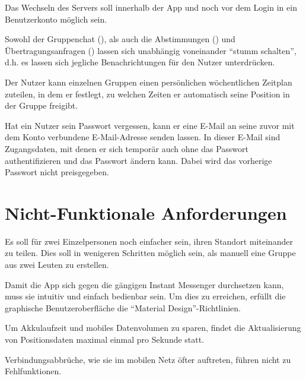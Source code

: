 \documentclass[parskip=full,11pt]{scrartcl}
\begin{document}
Das Wechseln des Servers soll innerhalb der App und noch vor dem Login in ein
Benutzerkonto möglich sein.

Sowohl der Gruppenchat (), als auch die
Abstimmungen () und Übertragungsanfragen
() lassen sich unabhängig voneinander
\enquote{stumm schalten}, d.h. es lassen sich jegliche Benachrichtungen für den
Nutzer unterdrücken.

Der Nutzer kann einzelnen Gruppen einen persönlichen wöchentlichen Zeitplan
zuteilen, in dem er festlegt, zu welchen Zeiten er automatisch seine Position
in der Gruppe freigibt.

Hat ein Nutzer sein Passwort vergessen, kann er eine E-Mail an seine zuvor
mit dem Konto verbundene E-Mail-Adresse senden lassen.
In dieser E-Mail sind Zugangsdaten, mit denen er sich temporär auch ohne das
Passwort authentifizieren und das Passwort ändern kann.
Dabei wird das vorherige Passwort nicht preisgegeben.


\section{Nicht-Funktionale Anforderungen}

Es soll für zwei Einzelpersonen noch einfacher sein, ihren Standort miteinander
zu teilen. Dies soll in wenigeren Schritten möglich sein, als manuell eine
Gruppe aus zwei Leuten zu erstellen.

Damit die App sich gegen die gängigen Instant Messenger durchsetzen kann, muss
sie intuitiv und einfach bedienbar sein. Um dies zu erreichen, erfüllt die
graphische Benutzeroberfläche die \enquote{Material Design}-Richtlinien.

Um Akkulaufzeit und mobiles Datenvolumen zu sparen, findet die Aktualisierung
von Positionsdaten maximal einmal pro Sekunde statt.

Verbindungsabbrüche, wie sie im mobilen Netz öfter auftreten, führen nicht zu
Fehlfunktionen.
\end{document}
